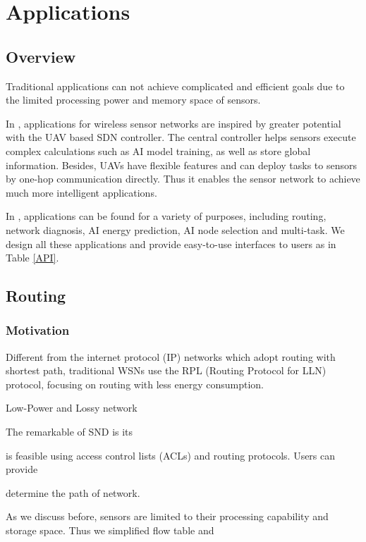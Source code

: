 \section{Applications}
\label{App}

\subsection{Overview}

Traditional applications can not achieve complicated and efficient goals due 
to the limited processing power and memory space of sensors.

In {\sdn}, applications for wireless sensor networks are inspired by 
greater potential with the UAV based SDN controller. The central controller
helps sensors execute complex calculations such as AI model training, as well 
as store global information. Besides, UAVs have flexible features and can deploy 
tasks to sensors by one-hop communication directly. Thus it enables the sensor network
to achieve much more intelligent applications.

In {\sdn}, applications can be found for a variety of purposes, including routing, network diagnosis,
AI energy prediction, AI node selection and multi-task. We design all these applications and provide 
easy-to-use interfaces to users as in Table \ref{API}.



\subsection{Routing}

\subsubsection{Motivation}

Different from the internet protocol (IP) networks which adopt
routing with shortest path,
traditional WSNs use the RPL (Routing Protocol for LLN) protocol,
focusing on routing with less energy consumption.

Low-Power and Lossy network

The remarkable of SND is its 

is feasible using access control lists (ACLs) and routing protocols. Users can provide 

determine the path of network.

As we discuss before, sensors are limited to their processing capability and storage space.
Thus we simplified flow table and 

